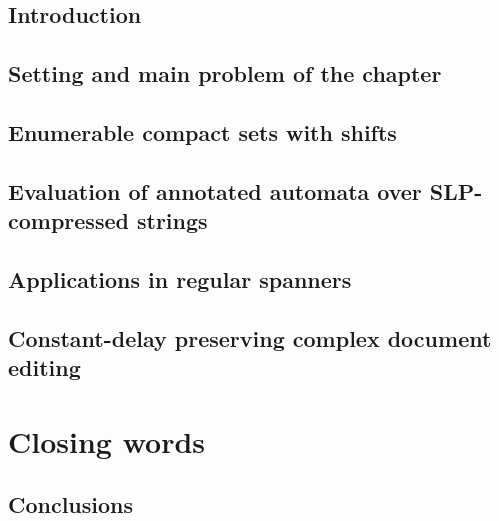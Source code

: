 \documentclass[pdftex]{pucthesis}	%
\begin{document}
\section{Introduction}\label{slps:sec:introduction}



\section{Setting and main problem of the chapter}\label{slps:sec:setting}



\section{Enumerable compact sets with shifts}\label{slps:sec:ecs}



\section{Evaluation of annotated automata over SLP-compressed strings}\label{slps:sec:evaluation}



\section{Applications in regular spanners}\label{slps:sec:spanners}



\section{Constant-delay preserving complex document editing}\label{slps:sec:edits}







\chapter[CLOSING WORDS]{Closing words}

\section{Conclusions}
\end{document}
